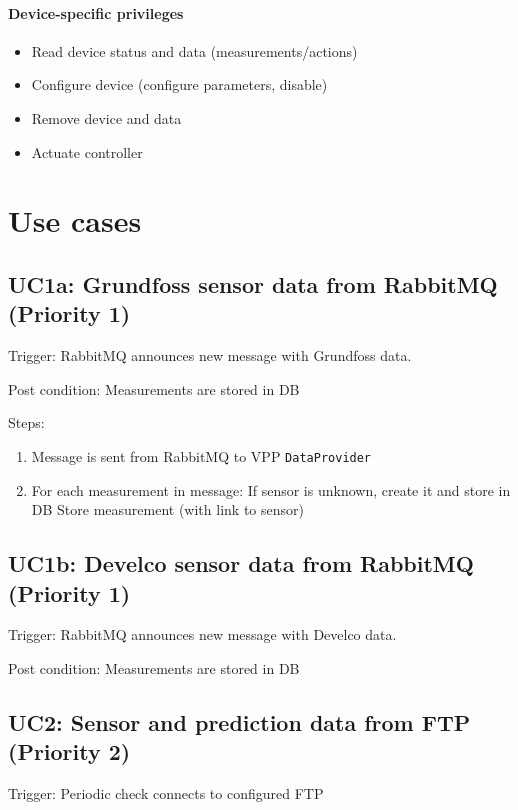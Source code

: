 \paragraph{Device-specific privileges}
\begin{itemize}
    \item{Read device status and data (measurements/actions)}
    \item{Configure device (configure parameters, disable)}
    \item{Remove device and data}
    \item{Actuate controller}
\end{itemize}

\newpage
\section{Use cases}

\subsection*{UC1a: Grundfoss sensor data from RabbitMQ (Priority 1)}\label{uc1}
\noindent Trigger: RabbitMQ announces new message with Grundfoss data.

\noindent Post condition: Measurements are stored in DB

\noindent Steps: 
\begin{enumerate}
    \item Message is sent from RabbitMQ to VPP \texttt{DataProvider}
    \item For each measurement in message:
        \subitem If sensor is unknown, create it and store in DB
        \subitem Store measurement (with link to sensor)
\end{enumerate}

\subsection*{UC1b: Develco sensor data from RabbitMQ (Priority 1)}\label{uc1}
\noindent Trigger: RabbitMQ announces new message with Develco data.

\noindent Post condition: Measurements are stored in DB

\subsection*{UC2: Sensor and prediction data from FTP (Priority 2)}
\noindent Trigger: Periodic check connects to configured FTP

